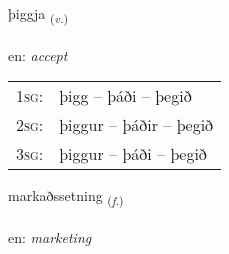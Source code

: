 \documentclass[frontgrid, backgrid]{flacards}\usepackage[]{graphicx}\usepackage[]{color}
\begin{document}
\renewcommand{\flhead}{\vskip5pt \fboxsep=0pt {\small\bfseries\footnotesize Sagnorð | Verb}}
\renewcommand{\fcfoot}{\vskip5pt \fboxsep=0pt \hspace{2pt}{\small\bfseries\footnotesize 2K}}

\renewcommand{\blhead}{\vskip5pt {\small\bfseries\footnotesize Sagnorð | Verb }}
\renewcommand{\bcfoot}{\vskip5pt \hspace{2pt}{\small\bfseries\footnotesize 2K}}


{þiggja \small{\textsubscript{(\textit{v.})}} \\[1ex] %
\textphonetic{[θɪca]} \\
en: \emph{accept} \\  [2ex]
\renewcommand*{\arraystretch}{0.8}
\begin{tabular}{p{1cm}l}
\textsc{1sg}: & þigg -- þáði -- þegið \\ 
\textsc{2sg}: & þiggur -- þáðir -- þegið \\ 
\textsc{3sg}: & þiggur -- þáði -- þegið \\ 
\end{tabular}
}

\renewcommand{\flhead}{\vskip5pt \fboxsep=0pt {\small\bfseries\footnotesize Nafnorð | Noun}}
\renewcommand{\fcfoot}{\vskip5pt \fboxsep=0pt \hspace{2pt}{\small\bfseries\footnotesize 2K}}

\renewcommand{\blhead}{\vskip5pt {\small\bfseries\footnotesize Nafnorð | Noun }}
\renewcommand{\bcfoot}{\vskip5pt \hspace{2pt}{\small\bfseries\footnotesize 2K}}


{markaðssetning \small{\textsubscript{(\textit{f.})}} \\[1ex] %
 \\
en: \emph{marketing} \\  [2ex]
\renewcommand*{\arraystretch}{0.8}
}
\end{document}

